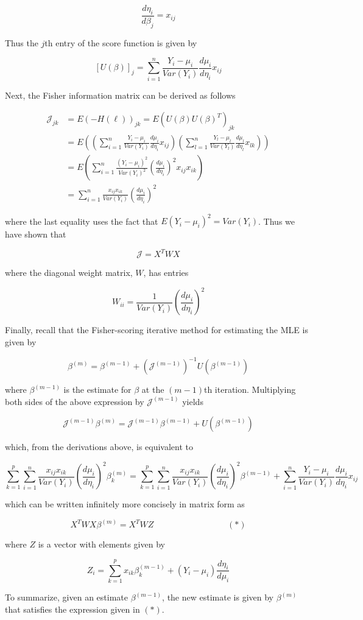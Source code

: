 $$\frac{d\eta_i}{d\beta_j} = x_{ij}$$


Thus the $j$th entry of the score function is given by

$$[U(\beta)]_j = \sum_{i=1}^n \frac{Y_i - \mu_i}{Var(Y_i)} \frac{d\mu_i}{d\eta_i} x_{ij}$$

Next, the Fisher information matrix can be derived as follows

\begin{align*}
\mathcal{J}_{jk} & = E(-H(\ell))_{jk} = E\left(U(\beta)U(\beta)^T\right)_{jk}\\
& = E\left( \left( \sum_{i=1}^n \frac{Y_i - \mu_i}{Var(Y_i)} \frac{d\mu_i}{d\eta_i} x_{ij} \right)\left( \sum_{l=1}^n \frac{Y_l - \mu_l}{Var(Y_l)} \frac{d\mu_l}{d\eta_l} x_{lk} \right)\right)\\
& = E\left( \sum_{i=1}^n \frac{(Y_i - \mu_i)^2}{Var(Y_i)^2} \left( \frac{d\mu_i}{d\eta_i} \right)^2 x_{ij}x_{ik} \right)\\
& = \sum_{i=1}^n \frac{x_{ij}x_{ik}}{Var(Y_i)} \left(\frac{d\mu_i}{d\eta_i} \right)^2
\end{align*}

where the last equality uses the fact that $E(Y_i - \mu_i)^2 = Var(Y_i)$. Thus we have shown that

$$\mathcal{J} = X^TWX$$

where the diagonal weight matrix, $W$, has entries

$$W_{ii} = \frac{1}{Var(Y_i)} \left( \frac{d\mu_i}{d\eta_i}\right)^2$$


Finally, recall that the Fisher-scoring iterative method for estimating the MLE is given by

$$\beta^{(m)} = \beta^{(m - 1)} + \left( \mathcal{J}^{(m-1)}\right)^{-1}U(\beta^{(m-1)})$$

where $\beta^{(m-1)}$ is the estimate for $\beta$ at the $(m-1)$th iteration. Multiplying both sides of the above expression by $\mathcal{J}^{(m-1)}$ yields

$$\mathcal{J}^{(m-1)} \beta^{(m)} = \mathcal{J}^{(m-1)} \beta^{(m-1)} + U\left(\beta^{(m-1)}\right)$$

which, from the derivations above, is equivalent to

$$\sum_{k=1}^p \sum_{i=1}^n \frac{x_{ij}x_{ik}}{Var(Y_i)} \left( \frac{d\mu_i}{d\eta_i} \right)^2 \beta_k^{(m)} = \sum_{k=1}^p \sum_{i=1}^n \frac{x_{ij}x_{ik}}{Var(Y_i)} \left( \frac{d\mu_i}{d\eta_i}\right)^2 \beta^{(m-1)} + \sum_{i=1}^n \frac{Y_i - \mu_i}{Var(Y_i)} \frac{d\mu_i}{d\eta_i} x_{ij}$$

which can be written infinitely more concisely in matrix form as

$$X^TWX \beta^{(m)} = X^TWZ ~~~~~~~~~~~~~~~~~~~~~~~~~~~~~~~~~~~~~~~ (*)$$

where $Z$ is a vector with elements given by

$$Z_i = \sum_{k=1}^px_{ik}\beta_k^{(m-1)} + (Y_i - \mu_i) \frac{d\eta_i}{d\mu_i}$$

To summarize, given an estimate $\beta^{(m-1)}$, the new estimate is given by $\beta^{(m)}$ that satisfies the expression given in $(*)$.



